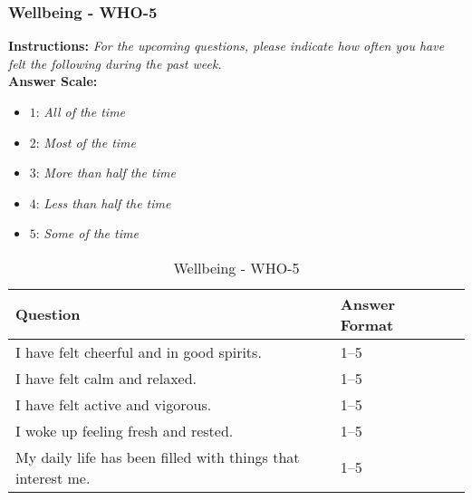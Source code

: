 \subsubsection{Wellbeing - WHO-5}
\textbf{Instructions:} \emph{For the upcoming questions, please indicate how often you have felt the following during the past week.}
\\
\textbf{Answer Scale:}
\begin{itemize}
    \item $1$: \emph{All of the time}
    \item $2$: \emph{Most of the time}
    \item $3$: \emph{More than half the time}
    \item $4$: \emph{Less than half the time}
    \item $5$: \emph{Some of the time}
\end{itemize}
\begin{table}[H]
    \centering
    \renewcommand{\arraystretch}{1.2}
    \begin{tabularx}{\textwidth}{|l|X|l|}
        \hline
        \textbf{Question} & \textbf{Answer Format} \\ \hline
        I have felt cheerful and in good spirits. & 1--5 \\ \hline
        I have felt calm and relaxed. & 1--5 \\ \hline
        I have felt active and vigorous. & 1--5 \\ \hline
        I woke up feeling fresh and rested. & 1--5 \\ \hline
        My daily life has been filled with things that interest me. & 1--5 \\ \hline
    \end{tabularx}
    \caption{Wellbeing - WHO-5}
    \label{tab:who-5}
\end{table}


\newpage
